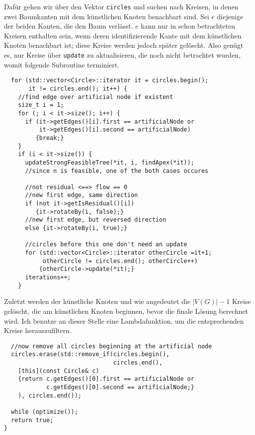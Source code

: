 Dafür gehen wir über den Vektor \lstinline|circles| und suchen nach Kreisen, in denen zwei Baumkanten mit dem künstlichen Knoten benachbart sind. Sei $e$ diejenige der beiden Kanten, die den Baum verlässt. $e$ kann nur in schon betrachteten Kreisen enthalten sein, wenn deren identifizierende Kante mit dem künstlichen Knoten benachbart ist; diese Kreise werden jedoch später gelöscht. Also genügt es, nur Kreise über \lstinline|update| zu aktualisieren, die noch nicht betrachtet wurden, womit folgende Subroutine terminiert.

\begin{lstlisting}
  for (std::vector<Circle>::iterator it = circles.begin();
       it != circles.end(); it++) {
    //find edge over artificial node if existent
    size_t i = 1;
    for (; i < it->size(); i++) {
      if (it->getEdges()[i].first == artificialNode or
          it->getEdges()[i].second == artificialNode)
         {break;}
    }
    if (i < it->size()) {
      updateStrongFeasibleTree(*it, i, findApex(*it));
      //since n is feasible, one of the both cases occures
  
      //not residual <==> flow == 0
      //new first edge, same direction
      if (not it->getIsResidual()[i])
         {it->rotateBy(i, false);}
      //new first edge, but reversed direction
      else {it->rotateBy(i, true);}
  
      //circles before this one don't need an update
      for (std::vector<Circle>::iterator otherCircle =it+1;
           otherCircle != circles.end(); otherCircle++)
          {otherCircle->update(*it);}
      iterations++;
    }
\end{lstlisting}

Zuletzt werden der künstliche Knoten und wie angedeutet die $|V(G)|-1$ Kreise gelöscht, die am künstlichen Knoten beginnen, bevor die finale Lösung berechnet wird. Ich benutze an dieser Stelle eine Lambdafunktion, um die entsprechenden Kreise herauszufiltern.

\begin{lstlisting}
  //now remove all circles beginning at the artificial node
  circles.erase(std::remove_if(circles.begin(), 
                               circles.end(),
    [this](const Circle& c)
    {return c.getEdges()[0].first == artificialNode or
            c.getEdges()[0].second == artificialNode;}
    ), circles.end());

  while (optimize());
  return true;
}
\end{lstlisting} 